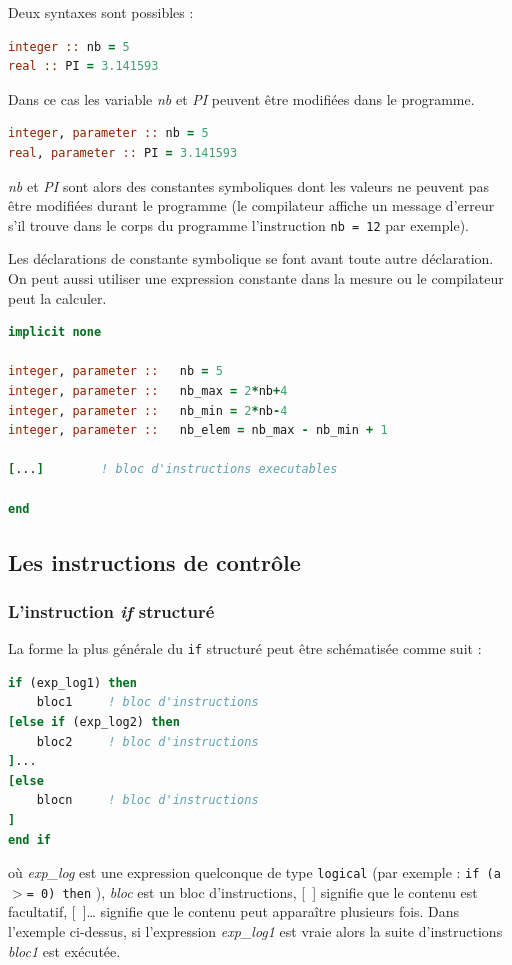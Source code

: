 \documentclass[a4paper,twoside]{article}
\begin{document}
Deux syntaxes sont possibles :
\begin{lstlisting}[language=Fortran]
integer :: nb = 5
real :: PI = 3.141593
\end{lstlisting}
Dans ce cas les variable \emph{nb} et \emph{PI} peuvent être modifiées dans le programme.

\begin{lstlisting}[language=Fortran]
integer, parameter :: nb = 5
real, parameter :: PI = 3.141593
\end{lstlisting}
\emph{nb} et \emph{PI} sont alors des constantes symboliques dont les valeurs ne peuvent pas être modi\-fiées durant le programme (le compilateur affiche un message d'erreur s'il trouve dans le corps du programme l'instruction \texttt{nb = 12} par exemple).

Les déclarations de constante symbolique se font avant toute autre déclaration. On peut aussi utiliser une expression constante dans la mesure ou le compilateur peut la calculer. 

\begin{lstlisting}[language=Fortran]
implicit none
  
integer, parameter ::   nb = 5
integer, parameter ::   nb_max = 2*nb+4
integer, parameter ::   nb_min = 2*nb-4
integer, parameter ::   nb_elem = nb_max - nb_min + 1

[...]        ! bloc d'instructions executables 

end
\end{lstlisting}

\subsection{Les instructions de contrôle}
\subsubsection{L'instruction \emph{if} structuré}

La forme la plus générale du \texttt{if} structuré peut être 
schématisée comme suit :
\begin{lstlisting}[language=Fortran]
if (exp_log1) then
    bloc1     ! bloc d'instructions 
[else if (exp_log2) then 
    bloc2     ! bloc d'instructions 
]...
[else
    blocn     ! bloc d'instructions 
] 
end if
\end{lstlisting}
où \emph{exp\_log} est une expression quelconque de type \texttt{logical} (par exemple : \texttt{if (a $>$= 0) then} ), \emph{bloc} est un bloc d'instruc\-tions, \mbox{[ ]} signifie que le contenu est facultatif, \mbox{[ ]\ldots} signifie que le contenu peut apparaître plusieurs fois. Dans l'exemple ci-dessus, si l'expression \emph{exp\_log1} est vraie alors la suite d'instruc\-tions \emph{bloc1} est exécutée. 
\end{document}
